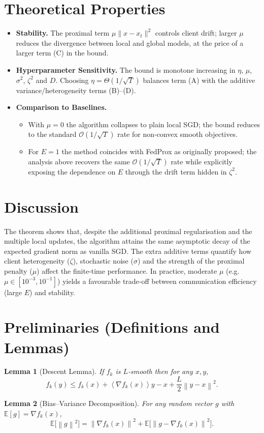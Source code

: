 \documentclass{article}
\newtheorem{lemma}{Lemma}
\newcommand{\E}{\mathbb{E}}
\newcommand{\norm}[1]{\left\|#1\right\|}
\newcommand{\inner}[1]{\left\langle #1 \right\rangle}
\begin{document}
\section*{Theoretical Properties}
\begin{itemize}
\item \textbf{Stability.} The proximal term $\mu\|x-x_t\|^2$ controls client drift;
      larger $\mu$ reduces the divergence between local and global models,
      at the price of a larger term (C) in the bound.
\item \textbf{Hyperparameter Sensitivity.}
      The bound is monotone increasing in $\eta$, $\mu$, $\sigma^2$, $\zeta^2$ and $D$.
      Choosing $\eta =\Theta(1/\sqrt{T})$ balances term (A) with the additive
      variance/heterogeneity terms (B)–(D).
\item \textbf{Comparison to Baselines.}
      \begin{itemize}
        \item With $\mu=0$ the algorithm collapses to plain local SGD; the bound
              reduces to the standard $\mathcal{O}(1/\sqrt{T})$ rate for non‑convex
              smooth objectives.
        \item For $E=1$ the method coincides with FedProx as originally proposed;
              the analysis above recovers the same $\mathcal{O}(1/\sqrt{T})$ rate
              while explicitly exposing the dependence on $E$ through the drift
              term hidden in $\zeta^2$.
      \end{itemize}
\end{itemize}

\section*{Discussion}
The theorem shows that, despite the additional proximal regularisation and the
multiple local updates, the algorithm attains the same asymptotic decay of the
expected gradient norm as vanilla SGD. The extra additive terms quantify how
client heterogeneity ($\zeta$), stochastic noise ($\sigma$) and the strength of the
proximal penalty ($\mu$) affect the finite‑time performance. In practice,
moderate $\mu$ (e.g. $\mu\in[10^{-3},10^{-1}]$) yields a favourable trade‑off between
communication efficiency (large $E$) and stability.

\newpage
\section*{Preliminaries (Definitions and Lemmas)}
\begin{lemma}[Descent Lemma]\label{lem:descent}
If $f_k$ is $L$‑smooth then for any $x,y$,
\[
f_k(y)\le f_k(x)+\inner{\nabla f_k(x)}{y-x}+\frac{L}{2}\norm{y-x}^2 .
\]
\end{lemma}
\begin{lemma}[Bias–Variance Decomposition]\label{lem:bv}
For any random vector $g$ with $\E[g]=\nabla f_k(x)$,
\[
\E\bigl[\norm{g}^2\bigr]=\norm{\nabla f_k(x)}^2+\E\bigl[\norm{g-\nabla f_k(x)}^2\bigr].
\]
\end{lemma}
\end{document}
